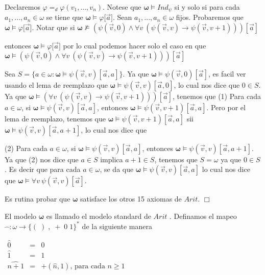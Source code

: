 Declaremos \(\varphi =_{d}\varphi (v_{1},...,v_{n})\). Notese que \(\mathbf{ \omega }\vDash Ind_{\psi }\) si y solo si para cada \(a_{1},...,a_{n}\in \omega \) se tiene que \(\mathbf{\omega }\vDash \varphi \lbrack \vec{a}]\). Sean \(a_{1},...,a_{n}\in \omega \) fijos. Probaremos que \(\mathbf{\omega } \vDash \varphi \lbrack \vec{a}]\). Notar que si
\(\displaystyle \mathbf{\omega }\nvDash (\psi (\vec{v},0)\wedge \forall v\ (\psi (\vec{v} ,v)\rightarrow \psi (\vec{v},v+1)))[\vec{a}] \)

entonces \(\mathbf{\omega }\vDash \varphi \lbrack \vec{a}]\) por lo cual podemos hacer solo el caso en que
\(\displaystyle \mathbf{\omega }\vDash (\psi (\vec{v},0)\wedge \forall v\ (\psi (\vec{v} ,v)\rightarrow \psi (\vec{v},v+1)))[\vec{a}] \)

Sea \(S=\{a\in \omega :\mathbf{\omega }\vDash \psi (\vec{v},v)[\vec{a},a]\}\). Ya que \(\mathbf{\omega }\vDash \psi (\vec{v},0)[\vec{a}]\), es facil ver usando el lema de reemplazo que \(\mathbf{\omega }\vDash \psi (\vec{v},v)[ \vec{a},0]\), lo cual nos dice que \(0\in S\). Ya que \(\mathbf{\omega }\vDash (\forall v\ (\psi (\vec{v},v)\rightarrow \psi (\vec{v},v+1)))[\vec{a}]\), tenemos que
(1) Para cada \(a\in \omega \), si \(\mathbf{\omega }\vDash \psi (\vec{v} ,v)[\vec{a},a]\), entonces \(\mathbf{\omega }\vDash \psi (\vec{v},v+1)[\vec{a} ,a]\).
Pero por el lema de reemplazo, tenemos que \(\mathbf{\omega }\vDash \psi ( \vec{v},v+1)[\vec{a},a]\) sii \(\mathbf{\omega }\vDash \psi (\vec{v},v)[\vec{a} ,a+1]\), lo cual nos dice que

(2) Para cada \(a\in \omega \), si \(\mathbf{\omega }\vDash \psi (\vec{v} ,v)[\vec{a},a]\), entonces \(\mathbf{\omega }\vDash \psi (\vec{v},v)[\vec{a} ,a+1]\).
Ya que (2) nos dice que \(a\in S\) implica \(a+1\in S\), tenemos que \(S=\omega \) ya que \(0\in S\). Es decir que para cada \(a\in \omega \), se da que \(\mathbf{ \omega }\vDash \psi (\vec{v},v)[\vec{a},a]\) lo cual nos dice que \(\mathbf{ \omega }\vDash \forall v\ \psi (\vec{v},v)[\vec{a}]\).

Es rutina probar que \(\mathbf{\omega }\) satisface los otros 15 axiomas de \( Arit\). \(\Box\)

El modelo \(\mathbf{\omega }\) es llamado el modelo standard de \(Arit\) . Definamos el mapeo \(\widehat{\ \ \ }:\omega \rightarrow \{(\;)\;,\;+\;0\;1\}^{\ast }\) de la siguiente manera

\(\displaystyle \begin{array}{rcl} \widehat{0} & =& 0 \\ \widehat{1} & =& 1 \\ \widehat{n+1} & =& +(\widehat{n},1)\text{, para cada }n\geq 1 \end{array} \)


